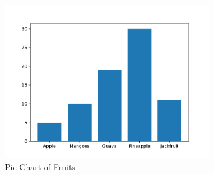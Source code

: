 \documentclass{article}
\begin{document}
\begin{figure}[h]
    \centering
    \includegraphics[width=0.8\textwidth]{bar.pdf}
    \caption{Pie Chart of Fruits}
    \label{fig:bar}
\end{figure}
\end{document}
